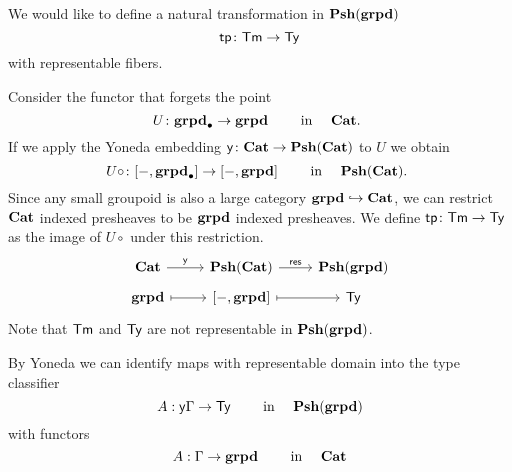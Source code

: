 \begin{defn}
  We would like to define a natural transformation in
  $\mathbf{Psh}(\mathbf{grpd})$
  \[ \mathsf{tp} \colon \mathsf{Tm} \to \mathsf{Ty} \]
  with representable fibers.

  Consider the functor that forgets the point
  \[
    U \colon \mathbf{grpd}_\bullet \to \mathbf{grpd}
    \quad \quad
    \text{
      in \quad $\mathbf{Cat}$.
    }
  \]
  If we apply the Yoneda embedding $\mathsf{y} \colon \mathbf{Cat} \to \mathbf{Psh}(\mathbf{Cat})$ to $U$
  we obtain
  \[ U \circ \colon [ - , \mathbf{grpd}_\bullet] \to [ - , \mathbf{grpd} ]
    \quad \quad
    \text{
      in \quad $\mathbf{Psh}(\mathbf{Cat})$.
    }
  \]
  Since any small groupoid is also a large category $\mathbf{grpd} \hookrightarrow \mathbf{Cat}$,
  we can restrict $\mathbf{Cat}$ indexed presheaves to be $\mathbf{grpd}$ indexed presheaves.
  We define $\mathsf{tp} \colon \mathsf{Tm} \to \mathsf{Ty}$ as the image of $U \circ$ under this restriction.
  \[\begin{tikzcd}[row sep = tiny]
    \Cat & \PshCat & \Pshgrpd \\
    \grpd & {[-,\grpd]} & \Type
    \arrow["\yo", from=1-1, to=1-2]
    \arrow["{\textsf{res}}", from=1-2, to=1-3]
    \arrow[maps to, from=2-1, to=2-2]
    \arrow[maps to, from=2-2, to=2-3]
  \end{tikzcd}\]
  Note that $\mathsf{Tm}$ and $\mathsf{Ty}$ are not representable in $\mathbf{Psh}(\mathbf{grpd})$.
\end{defn}

\medskip

\begin{rmk}
  By Yoneda we can identify maps with representable domain into the
  type classifier
  \[ A : \mathsf{y} \Gamma \to \mathsf{Ty} \quad \quad \text{ in } \quad \mathbf{Psh}(\mathbf{grpd}) \]
  with functors
  \[ A : \Gamma \to \mathbf{grpd} \quad \quad \text{ in } \quad \mathbf{Cat} \]

\end{rmk}

\medskip

